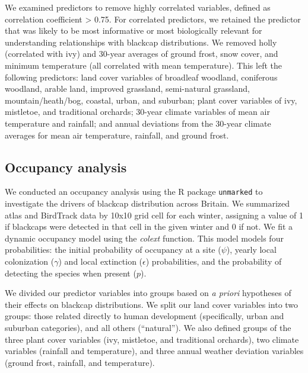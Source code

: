 \documentclass[a4paper, nobind]{templates/ociamthesis}
\begin{document}
We examined predictors to remove highly correlated variables, defined as correlation coefficient \textgreater{} 0.75. For correlated predictors, we retained the predictor that was likely to be most informative or most biologically relevant for understanding relationships with blackcap distributions. We removed holly (correlated with ivy) and 30-year averages of ground frost, snow cover, and minimum temperature (all correlated with mean temperature). This left the following predictors: land cover variables of broadleaf woodland, coniferous woodland, arable land, improved grassland, semi-natural grassland, mountain/heath/bog, coastal, urban, and suburban; plant cover variables of ivy, mistletoe, and traditional orchards; 30-year climate variables of mean air temperature and rainfall; and annual deviations from the 30-year climate averages for mean air temperature, rainfall, and ground frost.

\hypertarget{occupancy-analysis}{%
\subsection{Occupancy analysis}\label{occupancy-analysis}}

We conducted an occupancy analysis using the R package \texttt{unmarked} \autocite{fiskeUnmarkedPackageFitting2011} to investigate the drivers of blackcap distribution across Britain. We summarized atlas and BirdTrack data by 10x10 grid cell for each winter, assigning a value of 1 if blackcaps were detected in that cell in the given winter and 0 if not. We fit a dynamic occupancy model \autocite{mackenzieEstimatingSiteOccupancy2003} using the \emph{colext} function. This model models four probabilities: the initial probability of occupancy at a site (\(\psi\)), yearly local colonization (\(\gamma\)) and local extinction (\(\epsilon\)) probabilities, and the probability of detecting the species when present (\(p\)).

We divided our predictor variables into groups based on \emph{a priori} hypotheses of their effects on blackcap distributions. We split our land cover variables into two groups: those related directly to human development (specifically, urban and suburban categories), and all others (``natural''). We also defined groups of the three plant cover variables (ivy, mistletoe, and traditional orchards), two climate variables (rainfall and temperature), and three annual weather deviation variables (ground frost, rainfall, and temperature).
\end{document}
